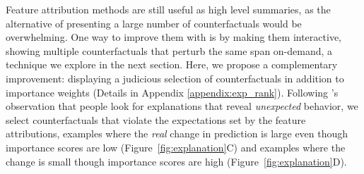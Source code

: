 Feature attribution methods are still useful as high level summaries, as the alternative of presenting a large number of counterfactuals would be overwhelming. One way to improve them with \sysname{} is by making them interactive, showing multiple counterfactuals that perturb the same span on-demand, a technique we explore in the next section. Here, we propose a complementary improvement: displaying a judicious selection of \sysname{} counterfactuals in addition to importance weights (Details in Appendix \ref{appendix:exp_rank}). 
Following \citet{miller}'s observation that people look for explanations that reveal \emph{unexpected} behavior, we select counterfactuals that violate the expectations set by the feature attributions, \ie examples where the \emph{real} change in prediction is large even though importance scores are low (Figure~\ref{fig:explanation}C) and examples where the change is small though importance scores are high (Figure~\ref{fig:explanation}D). 








